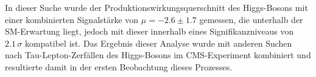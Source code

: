 In dieser Suche wurde der Produktionswirkungsquerschnitt des Higgs-Bosons mit einer kombinierten Signalst\"arke von $\mu = -2.6\pm1.7$ gemessen, die unterhalb der SM-Erwartung liegt, jedoch mit dieser innerhalb eines Signifikanzniveaus von $2.1\,\sigma$ kompatibel ist.
Das Ergebnis dieser Analyse wurde mit anderen Suchen nach Tau-Lepton-Zerf\"allen des Higgs-Bosons im CMS-Experiment kombiniert und resultierte damit in der ersten Beobachtung dieses Prozesses.
